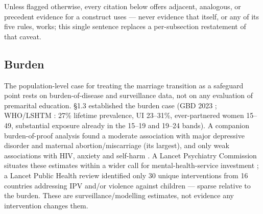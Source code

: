 
Unless flagged otherwise, every citation below offers adjacent, analogous, or precedent evidence for a construct \tphe{} uses --- never evidence that \tphe{} itself, or any of its five rules, works; this single sentence replaces a per-subsection restatement of that caveat.

\subsection{Burden}
The population-level case for treating the marriage transition as a safeguard point rests on burden-of-disease and surveillance data, not on any evaluation of premarital education. \S1.3 established the burden case (GBD 2023 \cite{ref1}; WHO/LSHTM \cite{ref2}: 27\% lifetime prevalence, UI 23--31\%, ever-partnered women 15--49, substantial exposure already in the 15--19 and 19--24 bands). A companion burden-of-proof analysis found a moderate association with major depressive disorder and maternal abortion/miscarriage (its largest), and only weak associations with HIV, anxiety and self-harm \cite{ref21}. A Lancet Psychiatry Commission situates these estimates within a wider call for mental-health-service investment \cite{ref22}; a Lancet Public Health review identified only 30 unique interventions from 16 countries addressing IPV and/or violence against children \cite{ref23} --- sparse relative to the burden. These are surveillance/modelling estimates, not evidence any intervention changes them.

